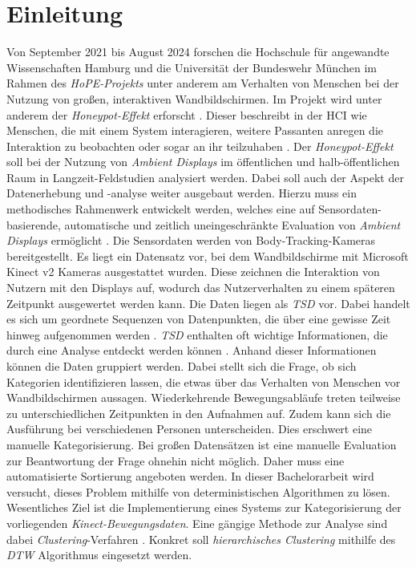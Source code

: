 \chapter{Einleitung}
\label{chapter1}
Von September 2021 bis August 2024 forschen die Hochschule für angewandte Wissenschaften Hamburg
und die Universität der Bundeswehr München im Rahmen des \emph{HoPE-Projekts} unter anderem am Verhalten
von Menschen bei der Nutzung von großen, interaktiven Wandbildschirmen.
Im Projekt wird unter anderem der \emph{Honeypot-Effekt} erforscht \citep{unibw_honeypot-effekt_2021}.
Dieser beschreibt in der \ac{HCI} wie Menschen, die mit einem System interagieren,
weitere Passanten anregen die Interaktion zu beobachten oder sogar an ihr teilzuhaben \citep{wouters_uncovering_2016}.
Der \emph{Honeypot-Effekt} soll bei der Nutzung von \emph{Ambient Displays} im öffentlichen
und halb-öffentlichen Raum in Langzeit-Feldstudien analysiert werden.
Dabei soll auch der Aspekt der Datenerhebung und -analyse weiter ausgebaut werden.
Hierzu muss ein methodisches Rahmenwerk entwickelt werden, welches eine auf Sensordaten-basierende,
automatische und zeitlich uneingeschränkte Evaluation von \emph{Ambient Displays} ermöglicht \citep{unibw_honeypot-effekt_2021}.
Die Sensordaten werden von Body-Tracking-Kameras bereitgestellt.
Es liegt ein Datensatz vor, bei dem Wandbildschirme mit Microsoft Kinect v2 Kameras ausgestattet wurden.
Diese zeichnen die Interaktion von Nutzern mit den Displays auf,
wodurch das Nutzerverhalten zu einem späteren Zeitpunkt ausgewertet werden kann.
Die Daten liegen als \emph{\ac{TSD}} vor.
Dabei handelt es sich um geordnete Sequenzen von Datenpunkten,
die über eine gewisse Zeit hinweg aufgenommen werden \citep{ali_clustering_2019}.
\emph{\ac{TSD}} enthalten oft wichtige Informationen, die durch eine Analyse entdeckt werden können \citep{ali_clustering_2019}.
Anhand dieser Informationen können die Daten gruppiert werden.
Dabei stellt sich die Frage, ob sich Kategorien identifizieren lassen,
die etwas über das Verhalten von Menschen vor Wandbildschirmen aussagen.
Wiederkehrende Bewegungsabläufe treten teilweise zu unterschiedlichen Zeitpunkten in den Aufnahmen auf.
Zudem kann sich die Ausführung bei verschiedenen Personen unterscheiden.
Dies erschwert eine manuelle Kategorisierung.
Bei großen Datensätzen ist eine manuelle Evaluation zur Beantwortung der Frage ohnehin nicht möglich.
Daher muss eine automatisierte Sortierung angeboten werden.
In dieser Bachelorarbeit wird versucht, dieses Problem mithilfe von deterministischen Algorithmen zu lösen.
Wesentliches Ziel ist die Implementierung eines Systems zur Kategorisierung der vorliegenden \emph{Kinect-Bewegungsdaten}.
Eine gängige Methode zur Analyse sind dabei \emph{Clustering}-Verfahren \citep{aghabozorgi_time-series_2015}.
Konkret soll \emph{hierarchisches Clustering} mithilfe des \emph{\ac{DTW}} Algorithmus eingesetzt werden.


